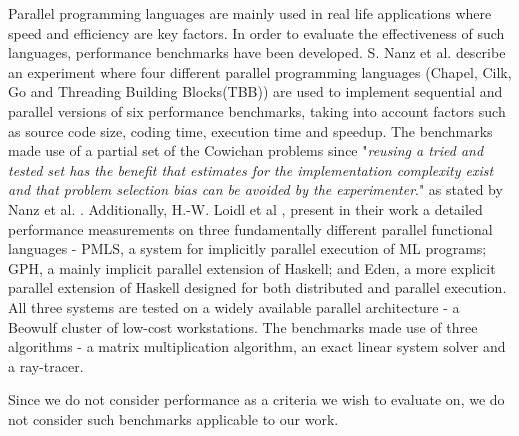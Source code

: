 Parallel programming languages are mainly used in real life applications where speed and efficiency are key factors. In order to evaluate the effectiveness of such languages, performance benchmarks have been developed. S. Nanz et al. \cite{MulticoreLangs} describe an experiment where four different parallel programming languages (Chapel, Cilk, Go and Threading Building Blocks(TBB)) are used to implement sequential and parallel versions of six performance benchmarks, taking into account factors such as source code size, coding time, execution time and speedup. The benchmarks made use of a partial set of the Cowichan problems \cite{CowichanProblems} since "\textit{reusing a tried and tested set has the benefit that
estimates for the implementation complexity exist and that
problem selection bias can be avoided by the experimenter}." as stated by Nanz et al. \cite{MulticoreLangs}. Additionally, H.-W. Loidl et al \cite{ParallelFunctLangs}, present in their work a detailed performance measurements on three fundamentally different parallel functional languages -  PMLS, a system for implicitly parallel execution of ML programs; GPH, a mainly implicit parallel extension of Haskell; and Eden, a more explicit parallel extension of Haskell designed for both distributed and parallel execution. All three systems are tested on a widely available parallel architecture - a Beowulf cluster of low-cost workstations. The benchmarks made use of three algorithms - a matrix multiplication algorithm, an exact linear system solver and a ray-tracer. 

Since we do not consider performance as a criteria we wish to evaluate on, we do not consider such benchmarks applicable to our work.

